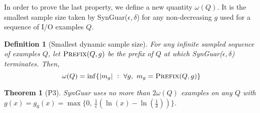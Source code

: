 \documentclass[11pt]{extarticle}
\newtheorem{theorem}{Theorem}[section]
\newtheorem{definition}{Definition}
\newcommand{\tool}{{\sc SynGuar}\xspace}
\newcommand{\parf}{g}
\begin{document}


In order to prove the last property, we define a new quantity $\omega(Q)$. It is the smallest sample size taken by \tool($\epsilon, \delta$) for any non-decreasing $g$ used for a sequence of I/O examples $Q$.

\begin{definition}[Smallest dynamic sample size]
    For any infinite sampled sequence of examples $Q$, let $\Call{Prefix}{Q,g}$ be the prefix of $Q$ at which \tool($\epsilon, \delta$) terminates. Then,  
    $$
    \omega(Q) = \inf \{ |m_g|~:~\forall g,\text{ } m_g = \Call{Prefix}{Q,g}\}
    $$
\end{definition}


\begin{theorem}[P3]
\label{thm:p3}
    \tool uses no more than $2\omega(Q)$ examples on any $Q$ with $\parf(x) = \parf_{0}(x)=\max\{0, ~\frac{1}{\epsilon}(\ln(x)-\ln(\frac{1}{\delta}))\}$.
\end{theorem}
\end{document}
